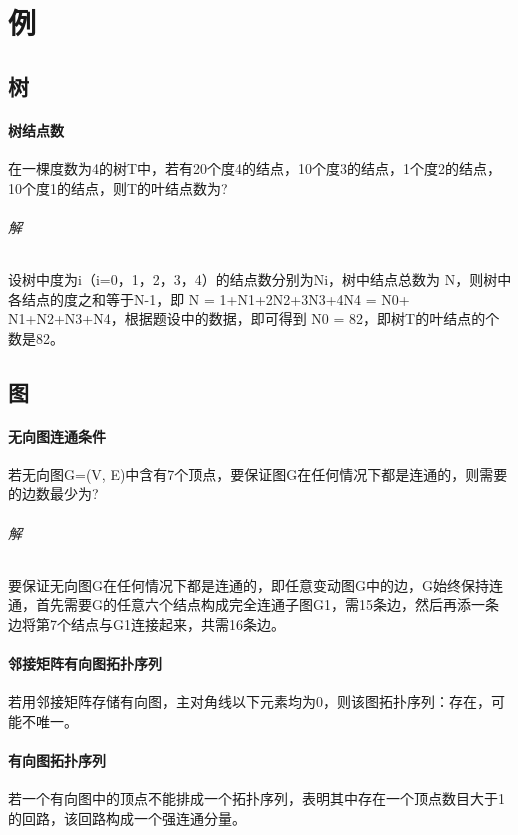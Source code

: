 
\chapter{例}

\section{树}

\subsubsection{树结点数}
在一棵度数为4的树T中，若有20个度4的结点，10个度3的结点，1个度2的结点，10个度1的结点，则T的叶结点数为?

\subparagraph{解}
设树中度为i（i=0，1，2，3，4）的结点数分别为Ni，树中结点总数为 N，则树中各结点的度之和等于N-1，即 N = 1+N1+2N2+3N3+4N4 = N0+ N1+N2+N3+N4，根据题设中的数据，即可得到 N0 = 82，即树T的叶结点的个数是82。


\section{图}

\subsubsection{无向图连通条件}
若无向图G=(V, E)中含有7个顶点，要保证图G在任何情况下都是连通的，则需要的边数最少为?

\subparagraph{解}
要保证无向图G在任何情况下都是连通的，即任意变动图G中的边，G始终保持连通，首先需要G的任意六个结点构成完全连通子图G1，需15条边，然后再添一条边将第7个结点与G1连接起来，共需16条边。 


\subsubsection{邻接矩阵有向图拓扑序列}
若用邻接矩阵存储有向图，主对角线以下元素均为0，则该图拓扑序列：存在，可能不唯一。


\subsubsection{有向图拓扑序列}
若一个有向图中的顶点不能排成一个拓扑序列，表明其中存在一个顶点数目大于1的回路，该回路构成一个强连通分量。


